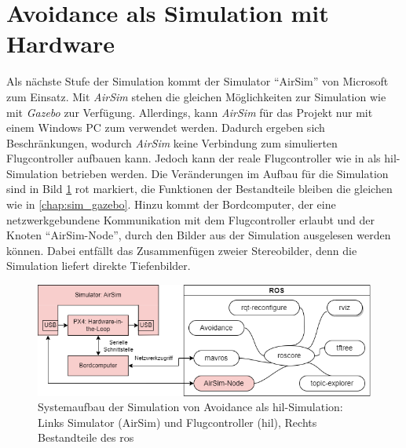 \section{Avoidance als Simulation mit Hardware}
Als nächste Stufe der Simulation kommt der Simulator \enquote{AirSim} von Microsoft zum Einsatz. Mit \textit{AirSim} stehen die gleichen Möglichkeiten zur Simulation wie mit \textit{Gazebo} zur Verfügung. Allerdings, kann \textit{AirSim} für das Projekt nur mit einem Windows PC zum verwendet werden. Dadurch ergeben sich Beschränkungen, wodurch \textit{AirSim} keine Verbindung zum simulierten Flugcontroller aufbauen kann. Jedoch kann der reale Flugcontroller wie in \cite[Kapitel 5]{markusreinErweiterungBestehenderDrohnen2023} als \gls{hil}-Simulation betrieben werden. Die Veränderungen im Aufbau für die Simulation sind in Bild \ref{fig:system_sim_airsim} rot markiert, die Funktionen der Bestandteile bleiben die gleichen wie in \cref{chap:sim_gazebo}. Hinzu kommt der Bordcomputer, der eine netzwerkgebundene Kommunikation mit dem Flugcontroller erlaubt und der Knoten \enquote{AirSim-Node}, durch den Bilder aus der Simulation ausgelesen werden können. Dabei entfällt das Zusammenfügen zweier Stereobilder, denn die Simulation liefert direkte Tiefenbilder.

\begin{figure}[!ht]
    \centering
    \includegraphics[width=\linewidth]{images/simulation_ros-Page-2.drawio.png}
    \caption[Systemaufbau der Simulation von Avoidance als \gls{hil}-Simulation]{Systemaufbau der Simulation von Avoidance als \gls{hil}-Simulation: Links Simulator (AirSim) und Flugcontroller (\gls{hil}), Rechts Bestandteile des \acrshort{ros}}
    \label{fig:system_sim_airsim}
\end{figure}

